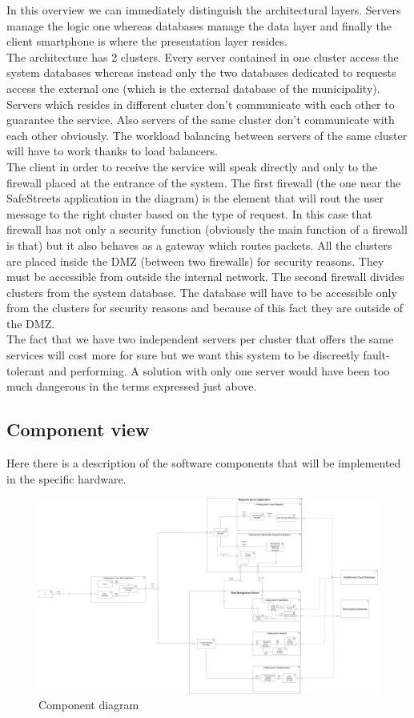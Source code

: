 \documentclass[titlepage]{article}
\begin{document}
In this overview we can immediately distinguish the architectural layers. Servers manage the logic one whereas databases manage the data layer and finally the client smartphone is where the presentation layer resides. \\
The architecture has 2 clusters. Every server contained in one cluster access the system databases whereas instead only the two databases dedicated to requests access the external one (which is the external database of the municipality). Servers which resides in different cluster don't communicate with each other to guarantee the service. Also servers of the same cluster don't communicate with each other obviously. The workload balancing between servers of the same cluster will have to work thanks to load balancers.\\
The client in order to receive the service will speak directly and only to the firewall placed at the entrance of the system. The first firewall (the one near the SafeStreets application in the diagram) is the element that will rout the user message to the right cluster based on the type of request. In this case that firewall has not only a security function (obviously the main function of a firewall is that) but it also behaves as a gateway which routes packets. All the clusters are placed inside the DMZ (between two firewalls) for security reasons. They must be accessible from outside the internal network. The second firewall divides clusters from the system database. The database will have to be accessible only from the clusters for security reasons and because of this fact they are outside of the DMZ.\\
The fact that we have two independent servers per cluster that offers the same services will cost more for sure but we want this system to be discreetly fault-tolerant and performing. A solution with only one server would have been too much dangerous in the terms expressed just above.
\subsection{Component view}
Here there is a description of the software components that will be implemented in the specific hardware.

\begin{figure}[h]
	\includegraphics[scale=0.1]{Diagrams/Component diagram.png}
	\caption{Component diagram}
\end{figure}
\FloatBarrier
\end{document}

